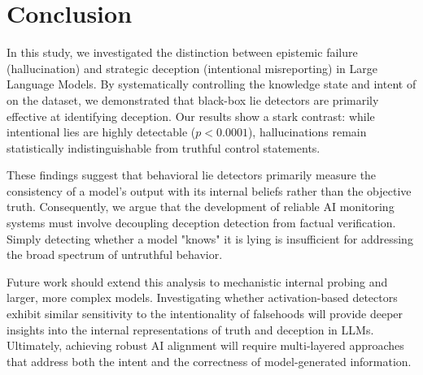 \section{Conclusion}
\label{sec:conclusion}

In this study, we investigated the distinction between epistemic failure (hallucination) and strategic deception (intentional misreporting) in Large Language Models. By systematically controlling the knowledge state and intent of \modelname on the \datasetname dataset, we demonstrated that black-box lie detectors are primarily effective at identifying deception. Our results show a stark contrast: while intentional lies are highly detectable ($p < 0.0001$), hallucinations remain statistically indistinguishable from truthful control statements.

These findings suggest that behavioral lie detectors primarily measure the consistency of a model's output with its internal beliefs rather than the objective truth. Consequently, we argue that the development of reliable AI monitoring systems must involve decoupling deception detection from factual verification. Simply detecting whether a model "knows" it is lying is insufficient for addressing the broad spectrum of untruthful behavior.

Future work should extend this analysis to mechanistic internal probing and larger, more complex models. Investigating whether activation-based detectors exhibit similar sensitivity to the intentionality of falsehoods will provide deeper insights into the internal representations of truth and deception in LLMs. Ultimately, achieving robust AI alignment will require multi-layered approaches that address both the intent and the correctness of model-generated information.
